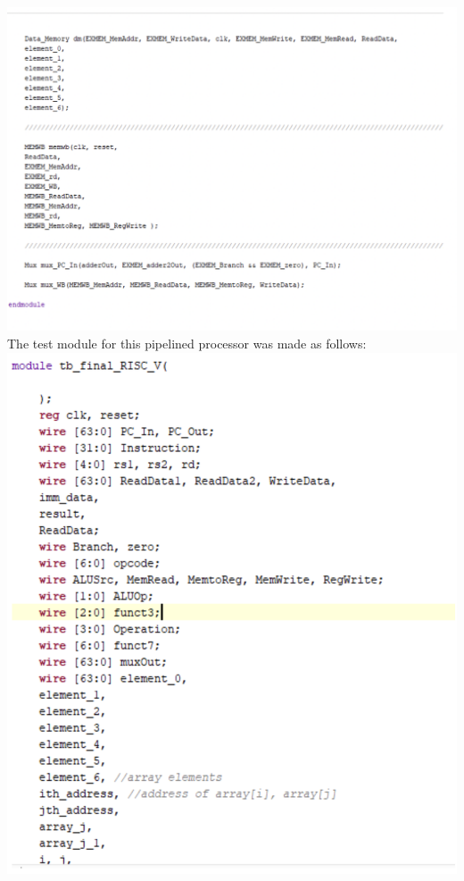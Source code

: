 \documentclass[a4paper, 12pt]{report}
\begin{document}
\\\includegraphics[scale = 0.5]{pipe top 6.png}
\\The test module for this pipelined processor was made as follows:
\\\includegraphics[scale = 0.5]{pipe test 1.png}
\end{document}
